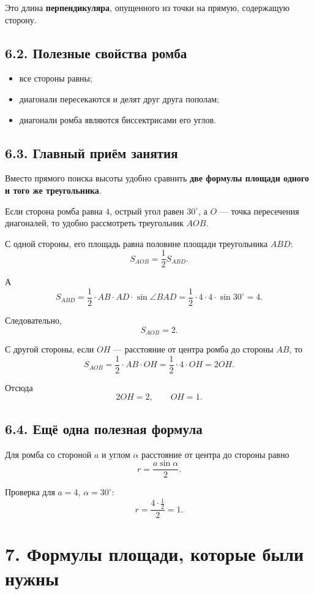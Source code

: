 \documentclass[a4paper,12pt]{article}
\begin{document}
Это длина \textbf{перпендикуляра}, опущенного из точки на прямую, содержащую сторону.

\subsection*{6.2. Полезные свойства ромба}

\begin{itemize}
    \item все стороны равны;
    \item диагонали пересекаются и делят друг друга пополам;
    \item диагонали ромба являются биссектрисами его углов.
\end{itemize}

\subsection*{6.3. Главный приём занятия}

Вместо прямого поиска высоты удобно сравнить \textbf{две формулы площади одного и того же треугольника}.

Если сторона ромба равна $4$, острый угол равен $30^\circ$, а $O$ --- точка пересечения диагоналей, то удобно рассмотреть треугольник $AOB$.

С одной стороны, его площадь равна половине площади треугольника $ABD$:
\[
S_{AOB}=\frac12 S_{ABD}.
\]

А
\[
S_{ABD}=\frac12 \cdot AB \cdot AD \cdot \sin \angle BAD
= \frac12\cdot 4\cdot 4\cdot \sin 30^\circ = 4.
\]

Следовательно,
\[
S_{AOB}=2.
\]

С другой стороны, если $OH$ --- расстояние от центра ромба до стороны $AB$, то
\[
S_{AOB}=\frac12 \cdot AB \cdot OH
=\frac12\cdot 4\cdot OH=2OH.
\]

Отсюда
\[
2OH=2,\qquad OH=1.
\]

\subsection*{6.4. Ещё одна полезная формула}

Для ромба со стороной $a$ и углом $\alpha$ расстояние от центра до стороны равно
\[
r=\frac{a\sin\alpha}{2}.
\]

Проверка для $a=4$, $\alpha=30^\circ$:
\[
r=\frac{4\cdot \tfrac12}{2}=1.
\]

\section*{7. Формулы площади, которые были нужны}
\end{document}
